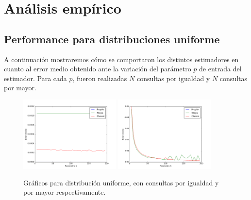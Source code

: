 \section{Análisis empírico}

\subsection{Performance para distribuciones uniforme}
A continuación mostraremos cómo se comportaron los distintos estimadores en cuanto al error medio obtenido ante la variación del parámetro $p$ de entrada del estimador. Para cada $p$, fueron realizadas $N$ consultas por igualdad y $N$ consultas por mayor.  


 
\begin{figure}[h!]  
  \centering
  \includegraphics[width=0.45\textwidth]{../source/datasets/img/uniformeEqual}
  \includegraphics[width=0.45\textwidth]{../source/datasets/img/uniformeGreater}
  \caption{Gráficos para distribución uniforme, con consultas por igualdad y por mayor respectivamente.}
 \end{figure}
 
